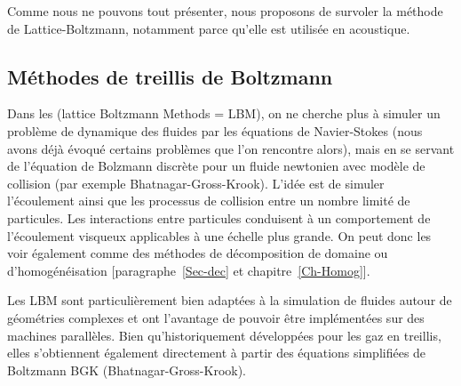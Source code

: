\medskip
Comme nous ne pouvons tout présenter, nous proposons de survoler la méthode de Lattice-Boltzmann, notamment parce qu'elle est utilisée en acoustique.

\medskip
\subsection{Méthodes de treillis de Boltzmann}
Dans les  (lattice Boltzmann Methods = LBM), on ne cherche plus à simuler un problème de dynamique des fluides par les équations de Navier-Stokes (nous avons déjà évoqué certains problèmes que l'on rencontre alors), mais en se servant de l'équation de Bolzmann discrète pour un fluide newtonien avec modèle de collision (par exemple Bhatnagar-Gross-Krook). L'idée est de simuler l'écoulement ainsi que les processus de collision entre un nombre limité de particules. Les interactions entre particules conduisent à un comportement de l'écoulement visqueux applicables à une échelle plus grande. On peut donc les voir également comme des méthodes de décomposition de domaine ou d'homogénéisation [paragraphe~\ref{Sec-dec} et chapitre~\ref{Ch-Homog}].

\medskip
Les LBM sont particulièrement bien adaptées à la simulation de fluides autour de géométries complexes et ont l'avantage de pouvoir être implémentées sur des machines parallèles. Bien qu'historiquement développées pour les gaz en treillis, elles s'obtiennent également directement à partir des équations simplifiées de Boltzmann BGK (Bhatnagar-Gross-Krook).

